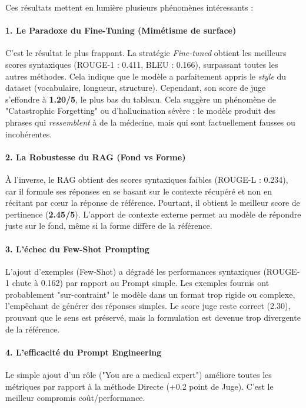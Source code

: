\documentclass[a4paper,11pt]{article}
\begin{document}
Ces résultats mettent en lumière plusieurs phénomènes intéressants :

\paragraph{1. Le Paradoxe du Fine-Tuning (Mimétisme de surface)}
C'est le résultat le plus frappant. La stratégie \textit{Fine-tuned} obtient les meilleurs scores syntaxiques (ROUGE-1 : 0.411, BLEU : 0.166), surpassant toutes les autres méthodes. Cela indique que le modèle a parfaitement appris le \textit{style} du dataset (vocabulaire, longueur, structure). 
Cependant, son score de juge s'effondre à \textbf{1.20/5}, le plus bas du tableau. Cela suggère un phénomène de "Catastrophic Forgetting" ou d'hallucination sévère : le modèle produit des phrases qui \textit{ressemblent} à de la médecine, mais qui sont factuellement fausses ou incohérentes.

\paragraph{2. La Robustesse du RAG (Fond vs Forme)}
À l'inverse, le RAG obtient des scores syntaxiques faibles (ROUGE-L : 0.234), car il formule ses réponses en se basant sur le contexte récupéré et non en récitant par cœur la réponse de référence.
Pourtant, il obtient le meilleur score de pertinence (\textbf{2.45/5}). L'apport de contexte externe permet au modèle de répondre juste sur le fond, même si la forme diffère de la référence.

\paragraph{3. L'échec du Few-Shot Prompting}
L'ajout d'exemples (Few-Shot) a dégradé les performances syntaxiques (ROUGE-1 chute à 0.162) par rapport au Prompt simple. Les exemples fournis ont probablement "sur-contraint" le modèle dans un format trop rigide ou complexe, l'empêchant de générer des réponses simples. Le score juge reste correct (2.30), prouvant que le sens est préservé, mais la formulation est devenue trop divergente de la référence.

\paragraph{4. L'efficacité du Prompt Engineering}
Le simple ajout d'un rôle ("You are a medical expert") améliore toutes les métriques par rapport à la méthode Directe (+0.2 point de Juge). C'est le meilleur compromis coût/performance.
\end{document}
